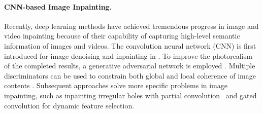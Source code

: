 \paragraph{CNN-based Image Inpainting.}
Recently, deep learning methods have achieved tremendous progress in image and video inpainting because of their capability of capturing high-level semantic information of images and videos. 
%
The convolution neural network (CNN) is first introduced for image denoising and inpainting in \cite{xie2012image}. 
To improve the photorealism of the completed results, a generative adversarial network is employed \cite{pathak2016context}.
Multiple discriminators can be used to constrain both global and local coherence of image contents \cite{iizuka2017globally}. 
Subsequent approaches solve more specific problems in image inpainting, such as inpainting irregular holes with partial convolution~\cite{liu2018partialinpainting} and gated convolution \cite{yu2018free} for dynamic feature selection.
%
 

